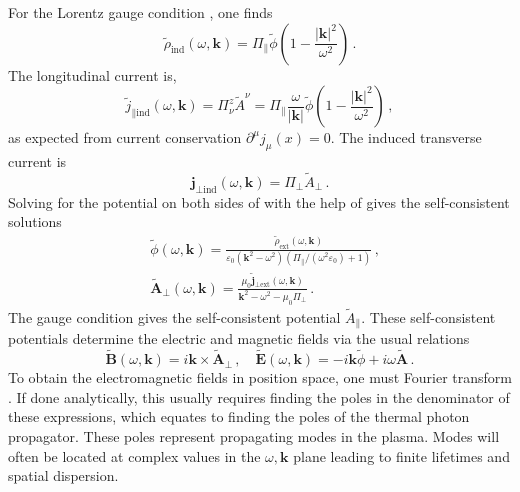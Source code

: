 For the Lorentz gauge condition , one finds
\begin{equation}\label{eq:indch}
    \widetilde{\rho}_\text{ind}(\omega,\boldsymbol{k})  = \Pi_{\parallel}\widetilde{\phi} \left(1 -\frac{|\boldsymbol{k}|^2}{\omega^2}\right)\,.
\end{equation}
The longitudinal current is,
\begin{equation}\label{eq:indjpar}
\widetilde{j}_{\parallel\text{ind}}(\omega,\boldsymbol{k})  =  \Pi^z_\nu \widetilde{A}^\nu  = \Pi_{\parallel}  \frac{\omega}{|\boldsymbol{k}|}\widetilde{\phi}\left(1-\frac{|\boldsymbol{k}|^2}{\omega^2} \right)\,,
\end{equation}
as expected from current conservation $\partial^\mu j_\mu(x) =0$.
The induced transverse current is
\begin{equation}\label{eq:indjperp}
   \boldsymbol{j}_{\perp\text{ind}}(\omega,\boldsymbol{k})  =  \Pi_{\perp} \widetilde{A}_\perp\,.
\end{equation}
Solving for the potential on both sides of  with the help of  gives the self-consistent solutions \cite{Grayson:2022asf}
\begin{align}\label{eq:phi}
&\widetilde{\phi}(\omega,\boldsymbol{k}) = \frac{\widetilde{\rho}_\text{ext}(\omega,\boldsymbol{k})}{\varepsilon_0(\boldsymbol{k}^2-\omega^2) \left(\Pi_{\parallel}/( \omega^2\varepsilon_0)+1\right) }\,, \\\label{eq:aperp}
&\widetilde{\boldsymbol{A}}_\perp(\omega,\boldsymbol{k}) = \frac{\mu_0 \widetilde{\boldsymbol{j}}_{\perp \text{ext}}(\omega,\boldsymbol{k})}{\boldsymbol{k}^2 - \omega^2 - \mu_0 \Pi_{\perp}}\,.
\end{align}
The gauge condition  gives the self-consistent potential $\widetilde{A}_\parallel$. These self-consistent potentials determine the electric and magnetic fields via the usual relations
\begin{equation}\label{eq:ftfields}
\widetilde{\boldsymbol{B}}(\omega,\boldsymbol{k}) = i\boldsymbol{k} \times \widetilde{\boldsymbol{A}}_\perp\,, \quad \widetilde{\boldsymbol{E}}(\omega,\boldsymbol{k}) = -i \boldsymbol{k} \widetilde{\phi} + i \omega \widetilde{\boldsymbol{A}}\,.
\end{equation}
To obtain the electromagnetic fields in position space, one must Fourier transform . If done analytically, this usually requires finding the poles in the denominator of these expressions, which equates to finding the poles of the thermal photon propagator. These poles represent propagating modes in the plasma. Modes will often be located at complex values in the $\omega, \mathbf{k}$ plane leading to finite lifetimes and spatial dispersion. 


